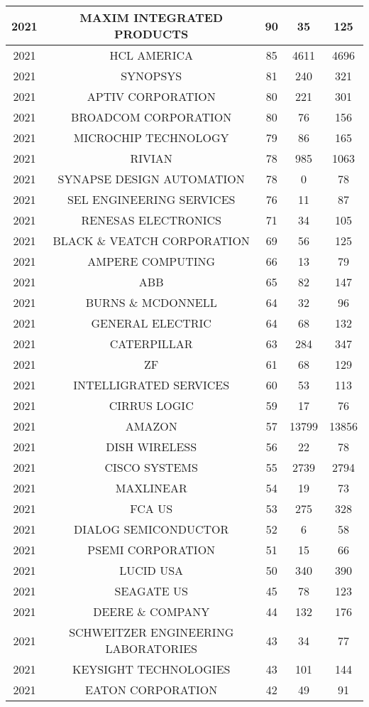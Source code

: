 \documentclass{article}%
\begin{document}
\begin{longtable}{c|c|c|c|c}
\hline%
2021&MAXIM INTEGRATED PRODUCTS&90&35&125\\%
\hline%
2021&HCL AMERICA&85&4611&4696\\%
\hline%
2021&SYNOPSYS&81&240&321\\%
\hline%
2021&APTIV CORPORATION&80&221&301\\%
\hline%
2021&BROADCOM CORPORATION&80&76&156\\%
\hline%
2021&MICROCHIP TECHNOLOGY&79&86&165\\%
\hline%
2021&RIVIAN&78&985&1063\\%
\hline%
2021&SYNAPSE DESIGN AUTOMATION&78&0&78\\%
\hline%
2021&SEL ENGINEERING SERVICES&76&11&87\\%
\hline%
2021&RENESAS ELECTRONICS&71&34&105\\%
\hline%
2021&BLACK \& VEATCH CORPORATION&69&56&125\\%
\hline%
2021&AMPERE COMPUTING&66&13&79\\%
\hline%
2021&ABB&65&82&147\\%
\hline%
2021&BURNS \& MCDONNELL&64&32&96\\%
\hline%
2021&GENERAL ELECTRIC&64&68&132\\%
\hline%
2021&CATERPILLAR&63&284&347\\%
\hline%
2021&ZF&61&68&129\\%
\hline%
2021&INTELLIGRATED SERVICES&60&53&113\\%
\hline%
2021&CIRRUS LOGIC&59&17&76\\%
\hline%
2021&AMAZON&57&13799&13856\\%
\hline%
2021&DISH WIRELESS&56&22&78\\%
\hline%
2021&CISCO SYSTEMS&55&2739&2794\\%
\hline%
2021&MAXLINEAR&54&19&73\\%
\hline%
2021&FCA US&53&275&328\\%
\hline%
2021&DIALOG SEMICONDUCTOR&52&6&58\\%
\hline%
2021&PSEMI CORPORATION&51&15&66\\%
\hline%
2021&LUCID USA&50&340&390\\%
\hline%
2021&SEAGATE US&45&78&123\\%
\hline%
2021&DEERE \& COMPANY&44&132&176\\%
\hline%
2021&SCHWEITZER ENGINEERING LABORATORIES&43&34&77\\%
\hline%
2021&KEYSIGHT TECHNOLOGIES&43&101&144\\%
\hline%
2021&EATON CORPORATION&42&49&91\\%

\end{longtable}
\end{document}
